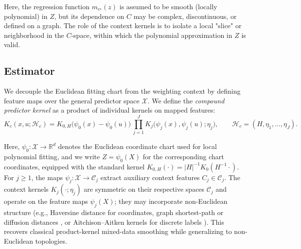 \documentclass[final,1p,times,authoryear]{elsarticle}
\newcommand{\R}{\mathbb{R}}
\newcommand{\Hcal}{\mathcal{H}}
\begin{document}
Here, the regression function $m_{c^\star}(z)$ is assumed to be smooth (locally polynomial) in $Z$, but its dependence on $C$ may be complex, discontinuous, or defined on a graph. The role of the context kernels is to isolate a local "slice" or neighborhood in the $C$-space, within which the polynomial approximation in $Z$ is valid. 

\subsection{Estimator}
We decouple the Euclidean fitting chart from the weighting context by defining feature maps over the general predictor space $\mathcal{X}$. We define the \emph{compound predictor kernel} as a product of individual kernels on mapped features:
\begin{equation}
\label{eq:kc_def}
K_c(x,u;\Hcal_c)
= K_{0,H}\!\big(\psi_0(x)-\psi_0(u)\big)\,
\prod_{j=1}^{J} K_j\!\big(\psi_j(x),\psi_j(u);\eta_j\big),
\qquad
\Hcal_c=(H,\eta_1,\ldots,\eta_J).
\end{equation}

Here, $\psi_0: \mathcal{X} \to \R^d$ denotes the Euclidean coordinate chart used for local polynomial fitting, and we write $Z=\psi_0(X)$ for the corresponding chart coordinates, equipped with the standard kernel $K_{0,H}(\cdot)=|H|^{-1}K_0(H^{-1}\cdot)$. For $j\ge1$, the maps $\psi_j: \mathcal{X} \to \mathcal{C}_j$ extract auxiliary context features $C_j \in \mathcal{C}_j$. The context kernels $K_j(\cdot;\eta_j)$ are symmetric on their respective spaces $\mathcal{C}_j$ and operate on the feature maps $\psi_j(X)$; they may incorporate non-Euclidean structure (e.g., Haversine distance for coordinates, graph shortest-path or diffusion distances \citep{shuman2013emerging}, or Aitchison--Aitken kernels for discrete labels \citep{aitchison1976multivariate}). This recovers classical product-kernel mixed-data smoothing while generalizing to non-Euclidean topologies.
\end{document}
